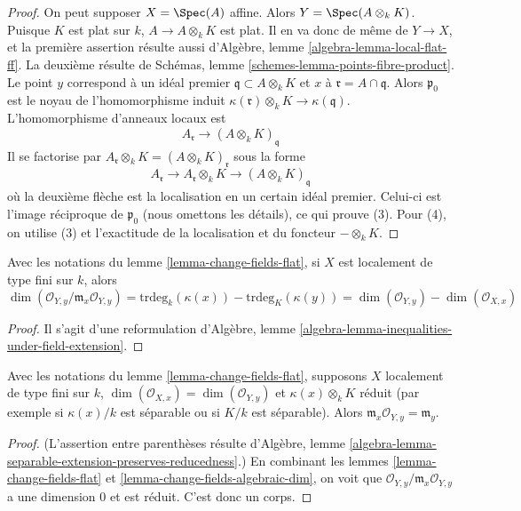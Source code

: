 \begin{proof}
On peut supposer $X = \Spec(A)$ affine. Alors
$Y = \Spec(A \otimes_k K)$. Puisque $K$ est plat sur $k$,
$A \to A \otimes_k K$ est plat. Il en va donc de même de $Y \to X$,
et la première assertion résulte aussi d'Algèbre, lemme
\ref{algebra-lemma-local-flat-ff}. La deuxième résulte de
Schémas, lemme \ref{schemes-lemma-points-fibre-product}. Le point
$y$ correspond à un idéal premier $\mathfrak q \subset A \otimes_k K$
et $x$ à $\mathfrak r = A \cap \mathfrak q$. Alors $\mathfrak p_0$
est le noyau de l'homomorphisme induit
$\kappa(\mathfrak r) \otimes_k K \to \kappa(\mathfrak q)$.
L'homomorphisme d'anneaux locaux est
$$
A_\mathfrak r \longrightarrow (A \otimes_k K)_\mathfrak q
$$
Il se factorise par
$A_\mathfrak r \otimes_k K =
(A \otimes_k K)_{\mathfrak r}$ sous la forme
$$
A_\mathfrak r \longrightarrow A_\mathfrak r \otimes_k K
\longrightarrow (A \otimes_k K)_\mathfrak q
$$
où la deuxième flèche est la localisation en un certain idéal
premier. Celui-ci est l'image réciproque de $\mathfrak p_0$
(nous omettons les détails), ce qui prouve (3). Pour (4), on utilise
(3) et l'exactitude de la localisation et du foncteur $- \otimes_k K$.
\end{proof}

\begin{lemma}
\label{lemma-change-fields-algebraic-dim}
Avec les notations du lemme \ref{lemma-change-fields-flat},
si $X$ est localement de type fini sur $k$, alors
$$
\dim(\mathcal{O}_{Y, y}/\mathfrak m_x\mathcal{O}_{Y, y}) =
\text{trdeg}_k(\kappa(x)) - \text{trdeg}_K(\kappa(y)) =
\dim(\mathcal{O}_{Y, y}) - \dim(\mathcal{O}_{X, x})
$$
\end{lemma}

\begin{proof}
Il s'agit d'une reformulation d'Algèbre, lemme
\ref{algebra-lemma-inequalities-under-field-extension}.
\end{proof}

\begin{lemma}
\label{lemma-change-fields-algebraic-unramified}
Avec les notations du lemme
\ref{lemma-change-fields-flat}, supposons $X$ localement de type fini
sur $k$, $\dim(\mathcal{O}_{X, x}) = \dim(\mathcal{O}_{Y, y})$
et $\kappa(x) \otimes_k K$ réduit (par exemple si
$\kappa(x)/k$ est séparable ou si $K/k$ est séparable). Alors
$\mathfrak m_x \mathcal{O}_{Y, y} = \mathfrak m_y$.
\end{lemma}

\begin{proof}
(L'assertion entre parenthèses résulte d'Algèbre, lemme
\ref{algebra-lemma-separable-extension-preserves-reducedness}.)
En combinant les lemmes \ref{lemma-change-fields-flat} et
\ref{lemma-change-fields-algebraic-dim}, on voit que
$\mathcal{O}_{Y, y}/\mathfrak m_x \mathcal{O}_{Y, y}$ a une
dimension $0$ et est réduit. C'est donc un corps.
\end{proof}





